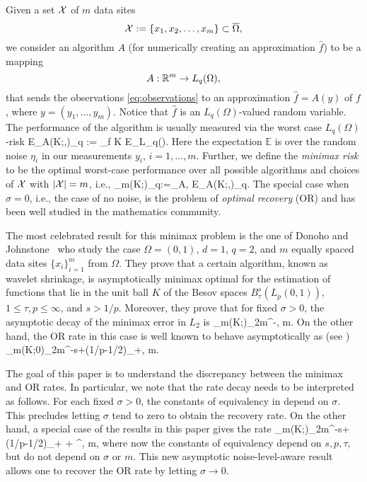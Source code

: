 Given a set ${\cal X}$ of $m$  data sites 
\begin{equation}
{\cal X}:=\{x_1, x_2, \ldots, x_m\}\subset \overline \Omega,
\end{equation}
we consider   an algorithm $A$ (for numerically creating an approximation  $\hat f$) to be a mapping 
 \begin{equation}
    A: \mathbb{R}^m \to L_q(\Omega),
\end{equation}
that sends  the observations \eqref{eq:observations} to an approximation $\hat{f} = A(y)$ of $f$, where $y=(y_1, \ldots, y_m)$.    Notice that $\hat f$ is an $L_q(\Omega)$-valued random variable.  The performance of the algorithm is usually measured via the worst case $L_q(\Omega)$-risk 
\be
    E_A(K;\sigma,\cX)_q := \sup_{f \in K} \: \mathbb E_{L_q(\Omega)}.
\ee
Here the expectation $\mathbb E$ is over the random noise $\eta_i$ in our measurements   $y_i$, $i=1,\dots,m$. Further, we define the
\emph{minimax risk} to be the optimal worst-case performance over all possible algorithms and choices of ${\cal X}$ with $|{\cal X}|=m$, i.e.,
\be
\label{MX}
\cR_m(K;\sigma)_q:={\inf_{A,\cX} E_A(K;\sigma,\cX)_q.
}
\ee
The special case when $\sigma=0$, i.e., the case of no noise, is the problem of \emph{optimal recovery} (OR) and has been well studied in the mathematics community.






The most celebrated result for this minimax problem is the one  of Donoho and Johnstone~\cite{DJ} who study the case   $\Omega=(0,1)$, $d=1$, $q=2$, and $m$ equally spaced  data sites $\{x_i\}_{i=1}^m$ from $\Omega$.   They prove that a certain algorithm, known as wavelet shrinkage, is asymptotically minimax optimal for the estimation of functions that lie in the unit ball $K$ of the Besov spaces $B_\tau^s(L_p(0,1))$,   $1 \leq \tau,p \leq \infty$, and $s > 1/p$. Moreover, they prove   that for fixed $\sigma>0$, the asymptotic decay of the minimax error in $L_2$ is
\be \label{DJminimax}
\cR_m(K;\sigma)_2\asymp m^{-}, \quad m.
\ee
On the other hand, the OR rate in this case is well known to  behave asymptotically as (see \cite{BDPS,NT,KNS})
\be \label{ORrate}
\cR_m(K;0)_2\asymp m^{-s+(1/p-1/2)_+}, \quad m.
\ee
 


The goal of this paper is to understand the discrepancy between the minimax and OR rates.  In particular, we note that the rate decay  needs to be interpreted as follows. For each fixed $\sigma>0$, the constants of equivalency in  depend on
$\sigma$. This precludes letting $\sigma$ tend to zero to obtain the   recovery rate.  On the other hand, a special case of the results in this paper gives the rate
\be 
\label{newminimax}
\cR_m(K;\sigma)_2\asymp m^{-s+(1/p-1/2)_+} + ^{}, \quad m,
\ee
where now the constants of equivalency depend on $s,p,\tau$, but do not depend on $\sigma$ or $m$.  This new asymptotic noise-level-aware result allows one to recover the OR rate by letting $\sigma\to 0$.   

